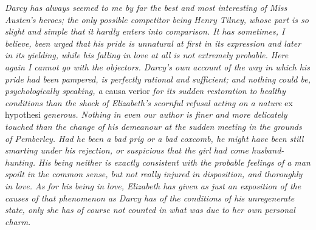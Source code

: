 \documentclass[12pt]{book}
\begin{document}
\textit{Darcy has always seemed to me by far the best and most interesting of Miss Austen's heroes; the only possible competitor being Henry Tilney, whose part is so slight and simple that it hardly enters into comparison. It has sometimes, I believe, been urged that his pride is unnatural at first in its expression and later in its yielding, while his falling in love at all is not extremely probable. Here again I cannot go with the objectors. Darcy's own account of the way in which his pride had been pampered, is perfectly rational and sufficient; and nothing could be, psychologically speaking, a} causa verior \textit{for its sudden restoration to healthy conditions than the shock of Elizabeth's scornful refusal acting on a nature} ex hypothesi \textit{generous. Nothing in even our author is finer and more delicately touched than the change of his demeanour at the sudden meeting in the grounds of Pemberley. Had he been a bad prig or a bad coxcomb, he might have been still smarting under his rejection, or suspicious that the girl had come husband-hunting. His being neither is exactly consistent with the probable feelings of a man spoilt in the common sense, but not really injured in disposition, and thoroughly in love. As for his being in love, Elizabeth has given as just an exposition of the causes of that phenomenon as Darcy has of the conditions of his unregenerate state, only she has of course not counted in what was due to her own personal charm.}
\end{document}
